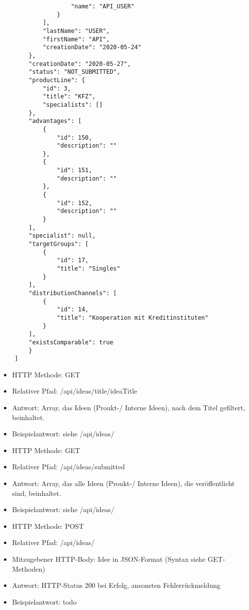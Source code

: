 \begin{itemize}
\begin{verbatim}
                    "name": "API_USER"
                }
            ],
            "lastName": "USER",
            "firstName": "API",
            "creationDate": "2020-05-24"
        },
        "creationDate": "2020-05-27",
        "status": "NOT_SUBMITTED",
        "productLine": {
            "id": 3,
            "title": "KFZ",
            "specialists": []
        },
        "advantages": [
            {
                "id": 150,
                "description": ""
            },
            {
                "id": 151,
                "description": ""
            },
            {
                "id": 152,
                "description": ""
            }
        ],
        "specialist": null,
        "targetGroups": [
            {
                "id": 17,
                "title": "Singles"
            }
        ],
        "distributionChannels": [
            {
                "id": 14,
                "title": "Kooperation mit Kreditinstituten"
            }
        ],
        "existsComparable": true
        }
    ]
    \end{verbatim}
\end{itemize}

\begin{itemize}
    \item HTTP Methode: GET
    \item Relativer Pfad: /api/ideas/title/{ideaTitle}
    \item Antwort: Array, das Ideen (Proukt-/ Interne Ideen), nach dem Titel gefiltert, beinhaltet.
    \item Beispielantwort: siehe /api/ideas/
\end{itemize}

\begin{itemize}
    \item HTTP Methode: GET
    \item Relativer Pfad: /api/ideas/submitted
    \item Antwort: Array, das alle Ideen (Proukt-/ Interne Ideen), die veröffentlicht sind, beinhaltet.
    \item Beispielantwort: siehe /api/ideas/
\end{itemize}

\begin{itemize}
    \item HTTP Methode: POST
    \item Relativer Pfad: /api/ideas/
    \item Mitzugebener HTTP-Body: Idee in JSON-Format (Syntax siehe GET-Methoden)
    \item Antwort: HTTP-Status 200 bei Erfolg, ansonsten Fehlerrückmeldung
    \item Beispielantwort: todo
\end{itemize}

